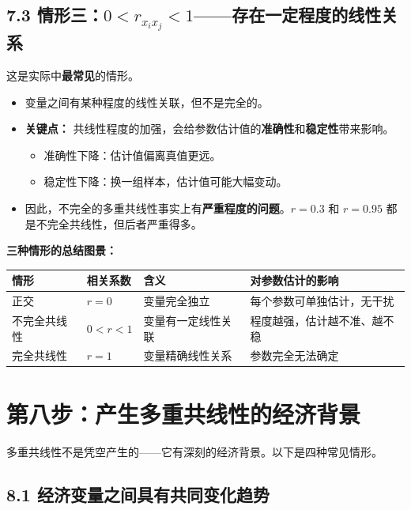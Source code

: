 \documentclass[12pt,a4paper]{ctexart}
\begin{document}
\subsection*{7.3 情形三：$0 < r_{x_i x_j} < 1$——存在一定程度的线性关系}

这是实际中\textbf{最常见}的情形。

\begin{itemize}
    \item 变量之间有某种程度的线性关联，但不是完全的。
    \item \textbf{关键点：} 共线性程度的加强，会给参数估计值的\textbf{准确性}和\textbf{稳定性}带来影响。
    \begin{itemize}
        \item 准确性下降：估计值偏离真值更远。
        \item 稳定性下降：换一组样本，估计值可能大幅变动。
    \end{itemize}
    \item 因此，不完全的多重共线性事实上有\textbf{严重程度的问题}。$r = 0.3$ 和 $r = 0.95$ 都是不完全共线性，但后者严重得多。
\end{itemize}

\textbf{三种情形的总结图景：}

\begin{center}
\begin{tabular}{@{}llll@{}}
\toprule
\textbf{情形} & \textbf{相关系数} & \textbf{含义} & \textbf{对参数估计的影响} \\
\midrule
正交 & $r=0$ & 变量完全独立 & 每个参数可单独估计，无干扰 \\
不完全共线性 & $0<r<1$ & 变量有一定线性关联 & 程度越强，估计越不准、越不稳 \\
完全共线性 & $r=1$ & 变量精确线性关系 & 参数完全无法确定 \\
\bottomrule
\end{tabular}
\end{center}

\section*{第八步：产生多重共线性的经济背景}

多重共线性不是凭空产生的——它有深刻的经济背景。以下是四种常见情形。

\subsection*{8.1 经济变量之间具有共同变化趋势}
\end{document}
